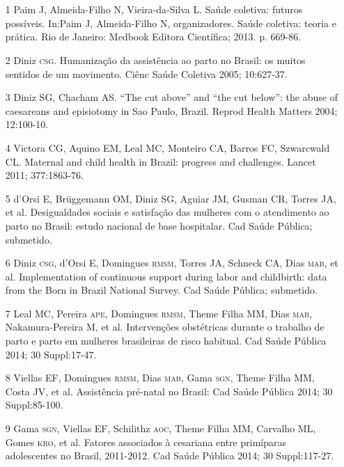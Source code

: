 \documentclass{article}
\begin{document}
\section*{}
\begin{itemize}

\item[1] Paim J, Almeida-Filho N, Vieira-da-Silva L. Saúde coletiva:
futuros possíveis. In:Paim J, Almeida-Filho N, organizadores. Saúde coletiva:
teoria e prática. Rio de Janeiro: Medbook Editora Científica; 2013. p.
669-86.

\item[2] Diniz \textsc{csg}. Humanização da assistência ao parto no Brasil: os
muitos sentidos de um movimento. Ciênc Saúde Coletiva 2005;
10:627-37.

\item[3] Diniz SG, Chacham AS. “The cut above” and “the cut below”: the
abuse of caesareans and episiotomy in Sao Paulo, Brazil. Reprod Health Matters
2004; 12:100-10.

\item[4] Victora CG, Aquino EM, Leal MC, Monteiro CA, Barros FC, Szwarcwald
CL. Maternal and child health in Brazil: progress and challenges. Lancet 2011;
377:1863-76.

\item[5] d’Orsi E, Brüggemann OM, Diniz SG, Aguiar JM, Gusman CR, Torres
JA, et al. Desigualdades sociais e satisfação das mulheres com o atendimento ao
parto no Brasil: estudo nacional de base hospitalar. Cad Saúde Pública;
submetido.

\item[6] Diniz \textsc{csg}, d’Orsi E, Domingues \textsc{rmsm}, Torres JA, Schneck CA, Dias
\textsc{mab}, et al. Implementation of continuous support during labor and childbirth:
data from the Born in Brazil National Survey. Cad Saúde Pública;
submetido.

\item[7] Leal MC, Pereira \textsc{ape}, Domingues \textsc{rmsm}, Theme Filha MM, Dias \textsc{mab},
Nakamura-Pereira M, et al. Intervenções obstétricas durante o trabalho de parto
e parto em mulheres brasileiras de risco habitual. Cad Saúde Pública 2014; 30
Suppl:17-47.

\item[8] Viellas EF, Domingues \textsc{rmsm}, Dias \textsc{mab}, Gama \textsc{sgn}, Theme Filha MM,
Costa JV, et al. Assistência pré-natal no Brasil: Cad Saúde Pública 2014; 30
Suppl:85-100.

\item[9] Gama \textsc{sgn}, Viellas EF, Schilithz \textsc{aoc}, Theme Filha MM, Carvalho ML,
Gomes \textsc{kro}, et al. Fatores associados à cesariana entre primíparas adolescentes
no Brasil, 2011-2012. Cad Saúde Pública 2014; 30 Suppl:117-27.


\end{itemize}
\end{document}

